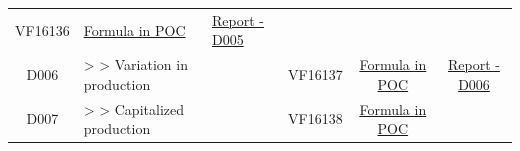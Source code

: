 \documentclass[]{book}
\begin{document}
\begin{longtable}[]{@{}cllccc@{}}
\begin{minipage}[t]{0.09\columnwidth}
VF16136\strut
\end{minipage} & \begin{minipage}[t]{0.15\columnwidth}\centering
\protect\hyperlink{d005---formula-in-poc}{Formula in POC}\strut
\end{minipage} & \begin{minipage}[t]{0.16\columnwidth}\centering
\href{./Auxiliary\%20Files/technical_reports/variable_report/D005.pdf}{Report - D005}\strut
\end{minipage}\tabularnewline
\begin{minipage}[t]{0.08\columnwidth}\centering
D006\strut
\end{minipage} & \begin{minipage}[t]{0.20\columnwidth}\raggedright
\textgreater{} \textgreater{} Variation in production\strut
\end{minipage} & \begin{minipage}[t]{0.16\columnwidth}\raggedright
\strut
\end{minipage} & \begin{minipage}[t]{0.09\columnwidth}\centering
VF16137\strut
\end{minipage} & \begin{minipage}[t]{0.15\columnwidth}\centering
\protect\hyperlink{d006---formula-in-poc}{Formula in POC}\strut
\end{minipage} & \begin{minipage}[t]{0.16\columnwidth}\centering
\href{./Auxiliary\%20Files/technical_reports/variable_report/D006(!).pdf}{Report - D006}\strut
\end{minipage}\tabularnewline
\begin{minipage}[t]{0.08\columnwidth}\centering
D007\strut
\end{minipage} & \begin{minipage}[t]{0.20\columnwidth}\raggedright
\textgreater{} \textgreater{} Capitalized production\strut
\end{minipage} & \begin{minipage}[t]{0.16\columnwidth}\raggedright
\strut
\end{minipage} & \begin{minipage}[t]{0.09\columnwidth}\centering
VF16138\strut
\end{minipage} & \begin{minipage}[t]{0.15\columnwidth}\centering
\protect\hyperlink{d007---formula-in-poc}{Formula in POC}\strut
\end{minipage} & \begin{minipage}[t]{0.16\columnwidth}\centering

\end{minipage}
\end{longtable}
\end{document}
